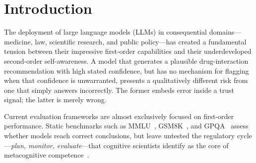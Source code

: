 \documentclass[12pt,a4paper]{article}
\begin{document}
\newpage
\tableofcontents
\newpage

\section{Introduction}
\label{sec:intro}

The deployment of large language models (LLMs) in consequential domains---medicine,
law, scientific research, and public policy---has created a fundamental tension between
their impressive first-order capabilities and their underdeveloped second-order self-awareness.
A model that generates a plausible drug-interaction recommendation with high stated
confidence, but has no mechanism for flagging when that confidence is unwarranted, presents
a qualitatively different risk from one that simply answers incorrectly. The former embeds
error inside a trust signal; the latter is merely wrong.

Current evaluation frameworks are almost exclusively focused on first-order performance.
Static benchmarks such as MMLU~\citep{hendrycks2020measuring}, GSM8K~\citep{cobbe2021training},
and GPQA~\citep{rein2023gpqa} assess whether models reach correct conclusions, but leave
untested the regulatory cycle---\emph{plan, monitor, evaluate}---that cognitive scientists
identify as the core of metacognitive competence~\citep{flavell1979metacognition,brown1978knowing}.
\end{document}
